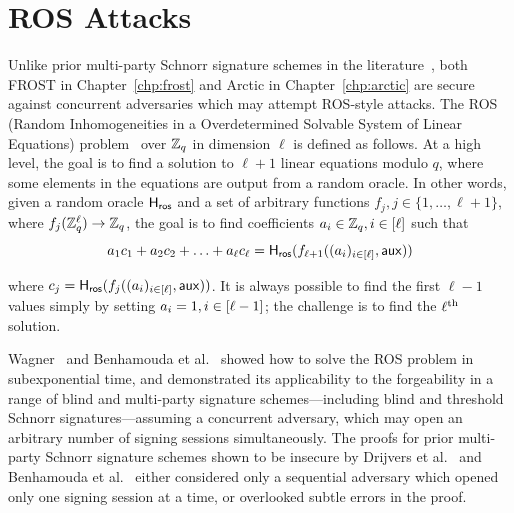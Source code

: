 \section{ROS Attacks}
\label{background:ros}

Unlike prior multi-party Schnorr signature schemes in the literature~\cite{DrijversEFKLNS19,BenhamoudaLLOR20},
both FROST in Chapter~\ref{chp:frost} and Arctic in Chapter~\ref{chp:arctic} are secure against concurrent adversaries which may attempt ROS-style attacks.
%
The ROS (Random Inhomogeneities in a Overdetermined Solvable System of Linear Equations) problem~\cite{schnorr06,BenhamoudaLLOR20,Schnorr01,FuchsbauerPS20}
over $\mathbb{Z}_q$ in dimension $\ell$
is defined as follows.
At a high level,
the goal is to find a solution to $\ell+1$ linear equations modulo $q$,
where some elements in the equations are output from a random oracle.
In other words,
given a random oracle $\mathsf{H}_{\mathsf{ros}}$ and a set of arbitrary functions
$f_j, j \in \{ 1, \ldots, \ell+1 \}$,
where $f_j(\mathbb{Z}_q^\ell) \rightarrow \mathbb{Z}_q$,
the goal is to find coefficients $a_{i} \in \mathbb{Z}_q, i \in [\ell]$ such that
\[
  a_{1} c_1 + a_{2} c_2 + \ldots + a_{\ell} c_\ell = \mathsf{H}_{\mathsf{ros}}(f_{\ell+1}((a_{i})_{i \in [\ell]}, \mathsf{aux}))
\]

\noindent where $c_j = \mathsf{H}_{\mathsf{ros}}(f_j((a_{i})_{i \in [\ell]}, \mathsf{aux}))$.
It is always possible to find the first $\ell-1$ values simply by setting
$a_{i} = 1, i \in [\ell-1]$;
the challenge is to find the $\ell^{\textrm{\scriptsize th}}$ solution.

Wagner~\cite{Wagner02} and Benhamouda et al.~\cite{BenhamoudaLLOR20} showed how to solve the ROS problem in subexponential time,
and demonstrated its applicability to the forgeability in a range of blind and multi-party
signature schemes---including blind and threshold Schnorr signatures---assuming a concurrent adversary,
which may open an arbitrary number of signing sessions simultaneously.
The proofs for prior multi-party Schnorr signature schemes shown to be insecure by
Drijvers et al.~\cite{DrijversEFKLNS19} and Benhamouda et al.~\cite{BenhamoudaLLOR20} either considered only a sequential adversary which opened only one signing session at a time,
or overlooked subtle errors in the proof.
